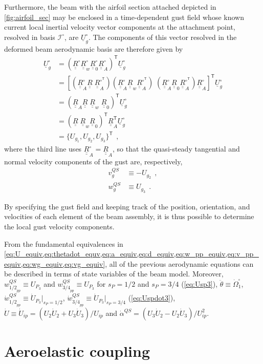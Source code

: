 \documentclass[12pt,a4paper,oneside,english]{abntex2} %
\newcommand{\fix}[1]{{\color{red}#1}}
\newcommand{\vect}[1]{\underline{#1}}
\def\tens#1{\underline{\underline{#1}}}
\def\lb{\left[}
\def\rb{\right]}
\def\lp{\left(}
\def\rp{\right)}
\def\T{\mathsf{T}}
\def\Io{\mathcal{I}^{\circ}}
\def\R{\tens{R}}
\def\Ro{\R^{\circ}}
\def\Rw{\R_w}
\def\Rwo{\R^{\circ}_w}
\def\Rz{\R_0}
\def\Rzo{\R^{\circ}_0}
\def\RA{\R_A}
\def\RAT{\R^\T_A}
\def\RAo{\R^{\circ}_A}
\def\RAoT{\R^{\circ^\T}_A}
\def\RRwRzT{\lp\R\;\Rw\Rz\rp^\T}
\def\U{\vect{U}}
\def\Ug{\U_g}
\def\Ugo{\Ug^\circ}
\def\Ugsq{\Ug^\square}
\def\thetaddot{\ddot{\theta}}
\begin{document}
Furthermore, the beam with the airfoil section attached depicted in \cref{fig:airfoil_sec} may be enclosed in a time-dependent gust field whose known current local inertial velocity vector components at the attachment point, resolved in basis $\Io$, are $\Ugo$. The components of this vector resolved in the deformed beam aerodynamic basis are therefore given by 
\begin{align}
    \Ugsq &= \lp\Ro\Rwo\Rzo\RAo\rp^\T\Ugo
    \nonumber 
    \\
    &= \lb\lp\RAo\R\;\RAoT\rp\lp\RAo\Rw\RAoT\rp\;\lp\RAo\Rz\RAoT\rp\RAo\rb^\T\Ugo 
    \nonumber 
    \\
    &= \lp\RA\R\;\Rw\;\Rz\rp^\T\Ugo  
    \nonumber 
    \\
    &= \RRwRzT\RAT\Ugo
    \label{eq:Ugs} 
    \\
    &=\{U_{g_1},U_{g_2},U_{g_3}\}^\T \ \ ,
\end{align}
\fix{where the third line uses $\RAo=\RA$,} so that the quasi-steady tangential and normal velocity components of the gust are, respectively,
\begin{align}
    v_g^{QS} &\equiv -U_{g_2} \ \ ,
    \label{eq:vg_equiv}
    \\
    w_g^{QS} &\equiv U_{g_3} \ \ .
    \label{eq:wg_equiv}
\end{align}

By specifying the gust field and keeping track of the position, orientation, and velocities of each element of the beam assembly, it is thus possible to determine the local gust velocity components.

From the fundamental equivalences in \cref{eq:U_equiv,eq:thetadot_equv,eq:a_equiv,eq:d_equiv,eq:w_pp_equiv,eq:v_pp_equiv,eq:wg_equiv,eq:vg_equiv}, all of the previous aerodynamic equations can be described in terms of state variables of the beam model. \fix{Moreover, $w_{{1/2}_{pp}}^{QS}\equiv U_{P_3}$ and $w_{{3/4}_{pp}}^{QS}\equiv U_{P_3}$ for $s_P=1/2$ and $s_P=3/4$ (\cref{eq:Usp3}), $\thetaddot\equiv\dot\Omega_1^\square$, $\dot w_{{1/2}_{pp}}^{QS}\equiv\dot U_{P_3}|_{s_P=1/2}$, $\dot w_{{3/4}_{pp}}^{QS}\equiv\dot U_{P_3}|_{s_P=3/4}$ (\cref{eq:Uspdot3}), $\dot U\equiv\dot U_{ip}=(U_2\dot U_2+U_3\dot U_3)/U_{ip}$ and $\dot\alpha^{QS}=(U_3\dot U_2-U_2\dot U_3)/U_{ip}^2$.}

\section{Aeroelastic coupling}
\label{sec:aero_coupling}
\end{document}
